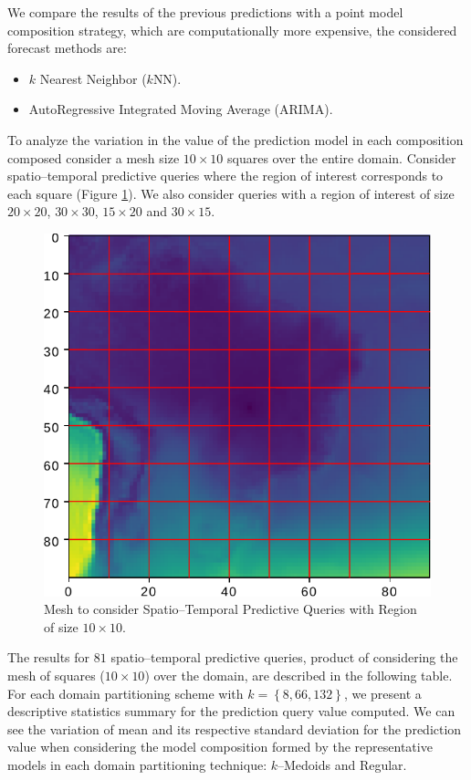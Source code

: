We compare the results of the previous predictions with a point model composition strategy, which are computationally more expensive, the considered forecast methods are: 
\begin{itemize}
	\item $k$ Nearest Neighbor ($k$NN).
	\item AutoRegressive Integrated Moving Average (ARIMA).
\end{itemize}

To analyze the variation in the value of the prediction model in each composition composed consider a mesh size $10\times 10$ squares over the entire domain. Consider spatio--temporal predictive queries where the region of interest corresponds to each square (Figure \ref{Fig:Query_10x10_whole_real_brazil}). We also consider queries with a region of interest of size $20\times 20$, $30 \times 30$, $15 \times 20$ and $30 \times 15$. 

\begin{figure}[h]
	\centering
	\includegraphics[scale=0.75]{../Figures/query_10x10_whole_real_brazil}
	\caption{Mesh to consider Spatio--Temporal Predictive Queries with Region of size $10 \times 10$.}
	\label{Fig:Query_10x10_whole_real_brazil}
\end{figure}

The results for $81$ spatio--temporal predictive queries, product of considering the mesh of squares ($10 \times 10$) over the domain, are described in the following table. For each domain partitioning scheme with $k = \left\{8, 66, 132 \right\}$, we present a descriptive statistics summary for the prediction query value computed. We can see the variation of mean and its respective standard deviation for the prediction value when considering the model composition formed by the representative models in each domain partitioning technique: $k$--Medoids and Regular.

